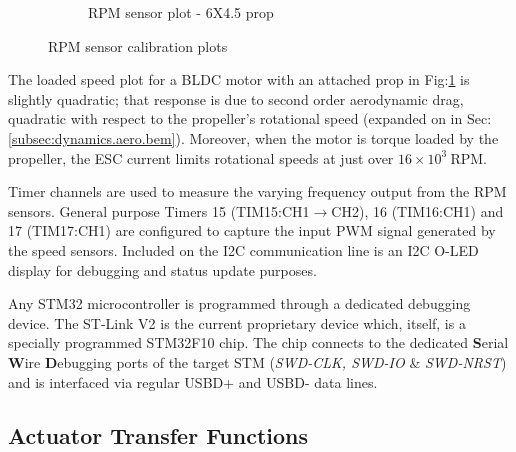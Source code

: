 \begin{figure}[htbp]
\begin{subfigure}{0.5\textwidth}
\caption{RPM sensor plot - 6X4.5 prop}
\label{fig:rpm-sensor-prop}
\end{subfigure}
\vspace{-4pt}
\caption{RPM sensor calibration plots}
\label{fig:rpm-sensor}
\vspace{-14pt}
\end{figure}
\par
The loaded speed plot for a BLDC motor with an attached prop in Fig:\ref{fig:rpm-sensor-prop} is slightly quadratic; that response is due to second order aerodynamic drag, quadratic with respect to the propeller's rotational speed (expanded on in Sec:\ref{subsec:dynamics.aero.bem}). Moreover, when the motor is torque loaded by the propeller, the ESC current limits rotational speeds at just over $16\times 10^3~\text{RPM}$.
\par
Timer channels are used to measure the varying frequency output from the RPM sensors. General purpose Timers 15 (TIM15:CH1$\rightarrow$CH2), 16 (TIM16:CH1) and 17 (TIM17:CH1) are configured to capture the input PWM signal generated by the speed sensors. Included on the I2C communication line is an I2C O-LED display for debugging and status update purposes.
\par
Any STM32 microcontroller is programmed through a dedicated debugging device. The ST-Link V2\cite{st-link} is the current proprietary device which, itself, is a specially programmed STM32F10 chip. The chip connects to the dedicated \textbf{S}erial \textbf{W}ire \textbf{D}ebugging ports of the target STM (\emph{SWD-CLK, SWD-IO} \& \emph{SWD-NRST}) and is interfaced via regular USBD+ and USBD- data lines. 
\subsection{Actuator Transfer Functions}
\label{subsec:proto.design.transfer}
